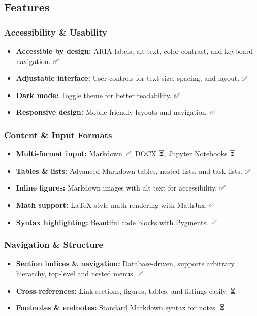 \subsection{Features}\label{features}

\subsubsection{Accessibility \&
Usability}\label{accessibility-usability}

\begin{itemize}
\tightlist
\item
  \textbf{Accessible by design:} ARIA labels, alt text, color contrast,
  and keyboard navigation. ✅
\item
  \textbf{Adjustable interface:} User controls for text size, spacing,
  and layout. ✅
\item
  \textbf{Dark mode:} Toggle theme for better readability. ✅
\item
  \textbf{Responsive design:} Mobile-friendly layouts and navigation. ✅
\end{itemize}

\subsubsection{Content \& Input Formats}\label{content-input-formats}

\begin{itemize}
\tightlist
\item
  \textbf{Multi-format input:} Markdown ✅, DOCX ⏳, Jupyter Notebooks
  ⏳
\item
  \textbf{Tables \& lists:} Advanced Markdown tables, nested lists, and
  task lists. ✅
\item
  \textbf{Inline figures:} Markdown images with alt text for
  accessibility. ✅
\item
  \textbf{Math support:} LaTeX-style math rendering with MathJax. ✅
\item
  \textbf{Syntax highlighting:} Beautiful code blocks with Pygments. ✅
\end{itemize}

\subsubsection{Navigation \& Structure}\label{navigation-structure}

\begin{itemize}
\tightlist
\item
  \textbf{Section indices \& navigation:} Database-driven, supports
  arbitrary hierarchy, top-level and nested menus. ✅
\item
  \textbf{Cross-references:} Link sections, figures, tables, and
  listings easily. ⏳
\item
  \textbf{Footnotes \& endnotes:} Standard Markdown syntax for notes. ⏳
\end{itemize}


